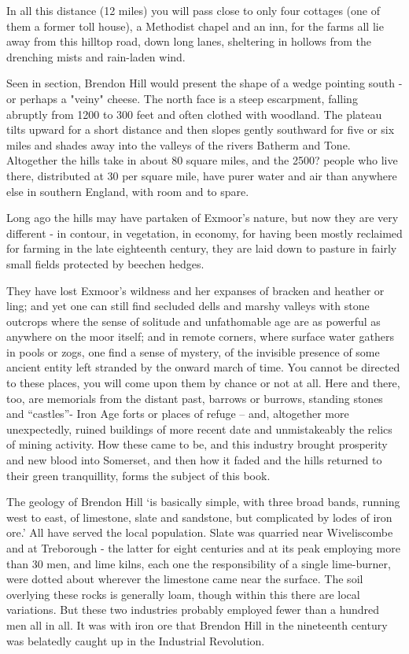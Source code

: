 \documentclass[10pt,a4paper]{article}
\begin{document}
In all this distance (12 miles) you will pass close to only four cottages (one of them a former toll house), a Methodist chapel and an inn, for the farms all lie away from this hilltop  road,  down long lanes, sheltering in hollows from the drenching  mists and rain-laden wind.

Seen in section, Brendon Hill would present the shape of a wedge pointing south - or perhaps a "veiny" cheese. The north face is a steep escarpment, falling abruptly from 1200 to 300 feet and often clothed with woodland. The plateau tilts upward for a short distance and then slopes gently southward for five or six miles and shades away into the valleys of the rivers Batherm and Tone. Altogether the hills take in about 80 square miles, and the 2500? people who live there, distributed at  30  per square mile, have purer water and air than anywhere else in southern England, with  room and to spare. 

Long ago  the hills may have partaken of Exmoor's nature, but now they are very different - in contour, in vegetation, in economy, for having been mostly reclaimed for farming in the late eighteenth century, they are  laid down to pasture in fairly small fields protected by beechen hedges.

They have lost Exmoor’s wildness and her expanses of bracken and heather or ling; and yet one can still find secluded dells and marshy valleys with stone outcrops where the sense of solitude and unfathomable age are as powerful as anywhere on the moor itself; and in remote corners, where surface water gathers in pools or zogs, one find a sense of mystery, of the invisible presence of some ancient entity left stranded by the onward march of time. You cannot be directed to these places, you will come upon them by chance or not at all. Here and there, too, are memorials from the distant past, barrows or burrows, standing stones and “castles”- Iron Age forts or places of refuge – and, altogether more unexpectedly, ruined buildings of more recent date and unmistakeably the relics of mining activity. How these came to be, and this industry brought prosperity and new blood into Somerset, and then how it faded and the hills returned to their green tranquillity, forms the subject of this book.	             

The geology of Brendon Hill ‘is basically simple, with three broad bands, running west to east, of limestone, slate and sandstone, but complicated by lodes of iron ore.’ All have served the local population.   Slate was quarried near Wiveliscombe and at Treborough - the latter for eight centuries and at its peak employing more than 30 men, and lime kilns, each one the responsibility of a single lime-burner,  were dotted about  wherever the limestone came near the surface. The soil overlying these rocks is generally loam, though within this there are local variations.  But these two industries probably employed fewer than a hundred men all in all. It was with iron ore that   Brendon Hill in the nineteenth century was belatedly caught up in the Industrial Revolution.                                  
\end{document}
